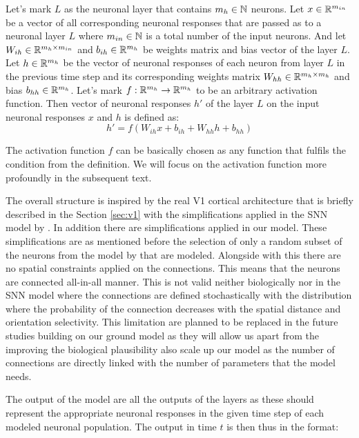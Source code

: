 \begin{defn}
    Let's mark $L$ as the neuronal layer that contains $m_{h} \in \mathbb{N}$ neurons. Let $x \in \mathbb{R}^{m_{in}}$ be a vector of all corresponding neuronal responses that are passed as to a neuronal layer $L$ where $m_{in} \in \mathbb{N}$ is a total number of the input neurons. And let $W_{ih} \in \mathbb{R}^{m_{h} \times m_{in}}$ and $b_{ih} \in \mathbb{R}^{m_{h}}$ be weights matrix and bias vector of the layer $L$. Let $h \in \mathbb{R}^{m_h}$ be the vector of neuronal responses of each neuron from layer $L$ in the previous time step and its corresponding weights matrix $W_{hh} \in \mathbb{R}^{m_{h} \times m_{h}}$ and bias $b_{hh} \in \mathbb{R}^{m_h}$. Let's mark $f: \mathbb{R}^{m_h} \to \mathbb{R}^{m_h}$ to be an arbitrary activation function. Then vector of neuronal responses $h'$ of the layer $L$ on the input neuronal responses $x$ and $h$ is defined as:
    $$h' = f\left(W_{ih}x + b_{ih} + W_{hh}h + b_{hh}\right)$$
\end{defn}
\label{def:base_neuron}

The activation function $f$ can be basically chosen as any function that fulfils the condition from the definition. We will focus on the activation function more profoundly in the subsequent text.

The overall structure is inspired by the real V1 cortical architecture that is briefly described in the Section \ref{sec:v1} with the simplifications applied in the SNN model by \citet{antolik2024comprehensive}. In addition there are simplifications applied in our model. These simplifications are as mentioned before the selection of only a random subset of the neurons from the model by \citet{antolik2024comprehensive} that are modeled. Alongside with this there are no spatial constraints applied on the connections. This means that the neurons are connected all-in-all manner. This is not valid neither biologically nor in the SNN model where the connections are defined stochastically with the distribution where the probability of the connection decreases with the spatial distance and orientation selectivity. This limitation are planned to be replaced in the future studies building on our ground model as they will allow us apart from the improving the biological plausibility also scale up our model as the number of connections are directly linked with the number of parameters that the model needs.

The output of the model are all the outputs of the layers as these should represent the appropriate neuronal responses in the given time step of each modeled neuronal population. The output in time $t$ is then thus in the format:

